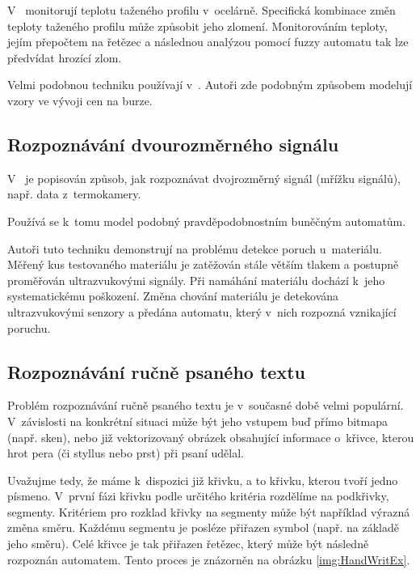 V~\cite{KemAda-SeqPatRecEmpRecFuzSys} monitorují teplotu taženého profilu v~ocelárně. Specifická kombinace změn teploty taženého profilu může způsobit jeho zlomení. Monitorováním teploty, jejím přepočtem na řetězec a následnou analýzou pomocí fuzzy automatu tak lze předvídat hrozící zlom.

Velmi podobnou techniku používají v~\cite{ManPra-PriPatDetUsFiStMaFuzTra}. Autoři zde podobným způsobem modelují vzory ve vývoji cen na burze.

\subsection{Rozpoznávání dvourozměrného signálu}
V~\cite{Jin+-WavBasFeaExtUsPrFiStAuPatCla} je popisován způsob, jak rozpoznávat dvojrozměrný signál (mřížku signálů), např. data z~termokamery.

Používá se k~tomu model podobný pravděpodobnostním buněčným automatům. 

Autoři tuto techniku demonstrují na problému detekce poruch u~materiálu. Měřený kus testovaného materiálu je zatěžován stále větším tlakem a postupně proměřován ultrazvukovými signály. Při namáhání materiálu dochází k~jeho systematickému poškození. Změna chování materiálu je detekována ultrazvukovými senzory a předána automatu, který v~nich rozpozná vznikající poruchu.

\subsection{Rozpoznávání ručně psaného textu} \label{subs:RecHandWrit}
Problém rozpoznávání ručně psaného textu je v~současné době velmi populární. V~závislosti na konkrétní situaci může být jeho vstupem buď přímo bitmapa (např. sken), nebo již vektorizovaný obrázek obsahující informace o~křivce, kterou hrot pera (či styllus nebo prst) při psaní udělal.

Uvažujme tedy, že máme k~dispozici již křivku, a to křivku, kterou tvoří jedno písmeno. V~první fázi křivku podle určitého kritéria rozdělíme na podkřivky, segmenty. Kritériem pro rozklad křivky na segmenty může být například výrazná změna směru. Každému segmentu je posléze přiřazen symbol (např. na základě jeho směru). Celé křivce je tak přiřazen řetězec, který může být následně rozpoznán automatem. Tento proces je znázorněn na obrázku \ref{img:HandWritEx}.

